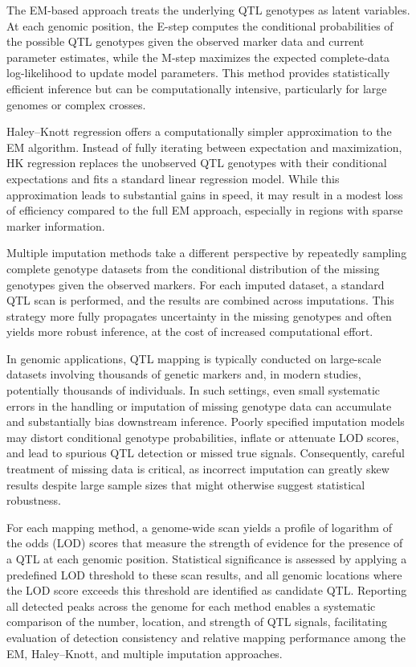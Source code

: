 \documentclass[
  12pt,
]{article}
\begin{document}
The EM-based approach treats the underlying QTL genotypes as latent
variables. At each genomic position, the E-step computes the conditional
probabilities of the possible QTL genotypes given the observed marker
data and current parameter estimates, while the M-step maximizes the
expected complete-data log-likelihood to update model parameters. This
method provides statistically efficient inference but can be
computationally intensive, particularly for large genomes or complex
crosses.

Haley--Knott regression offers a computationally simpler approximation
to the EM algorithm. Instead of fully iterating between expectation and
maximization, HK regression replaces the unobserved QTL genotypes with
their conditional expectations and fits a standard linear regression
model. While this approximation leads to substantial gains in speed, it
may result in a modest loss of efficiency compared to the full EM
approach, especially in regions with sparse marker information.

Multiple imputation methods take a different perspective by repeatedly
sampling complete genotype datasets from the conditional distribution of
the missing genotypes given the observed markers. For each imputed
dataset, a standard QTL scan is performed, and the results are combined
across imputations. This strategy more fully propagates uncertainty in
the missing genotypes and often yields more robust inference, at the
cost of increased computational effort.

In genomic applications, QTL mapping is typically conducted on
large-scale datasets involving thousands of genetic markers and, in
modern studies, potentially thousands of individuals. In such settings,
even small systematic errors in the handling or imputation of missing
genotype data can accumulate and substantially bias downstream
inference. Poorly specified imputation models may distort conditional
genotype probabilities, inflate or attenuate LOD scores, and lead to
spurious QTL detection or missed true signals. Consequently, careful
treatment of missing data is critical, as incorrect imputation can
greatly skew results despite large sample sizes that might otherwise
suggest statistical robustness.

For each mapping method, a genome-wide scan yields a profile of
logarithm of the odds (LOD) scores that measure the strength of evidence
for the presence of a QTL at each genomic position. Statistical
significance is assessed by applying a predefined LOD threshold to these
scan results, and all genomic locations where the LOD score exceeds this
threshold are identified as candidate QTL. Reporting all detected peaks
across the genome for each method enables a systematic comparison of the
number, location, and strength of QTL signals, facilitating evaluation
of detection consistency and relative mapping performance among the EM,
Haley--Knott, and multiple imputation approaches.
\end{document}
